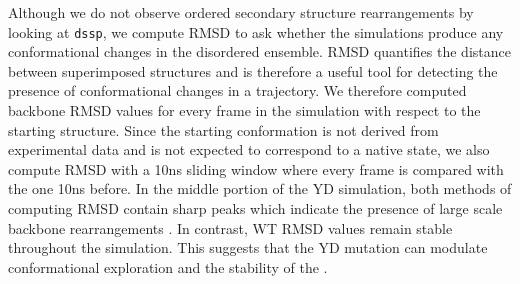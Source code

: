 \begin{figure}
	\centering     %
	\subfigure[WT]{\label{fig:ss_a}\texttt{[image: wt\_ss]}}
	\subfigure[YD]{\label{fig:ss_b}\texttt{[image: yd\_ss]}}
	\label{fig:ss}
\end{figure}	


Although we do not observe ordered secondary structure rearrangements by looking at \texttt{dssp}, we compute RMSD to ask whether the simulations produce any conformational changes in the disordered ensemble. RMSD quantifies the distance between superimposed structures and is therefore a useful tool for detecting the presence of conformational changes in a trajectory. We therefore computed backbone RMSD values for every frame in the simulation with respect to the starting structure. Since the starting conformation is not derived from experimental data and is not expected to correspond to a native state, we also compute RMSD with a 10ns sliding window where every frame is compared with the one 10ns before. In the middle portion of the YD simulation, both methods of computing RMSD contain sharp peaks which indicate the presence of large scale backbone rearrangements . In contrast, WT RMSD values remain stable throughout the simulation. This suggests that the YD mutation can modulate conformational exploration and the stability of the \gct. 


\begin{figure}
	\centering     %
	\label{fig:rmsd}
\end{figure}
	
